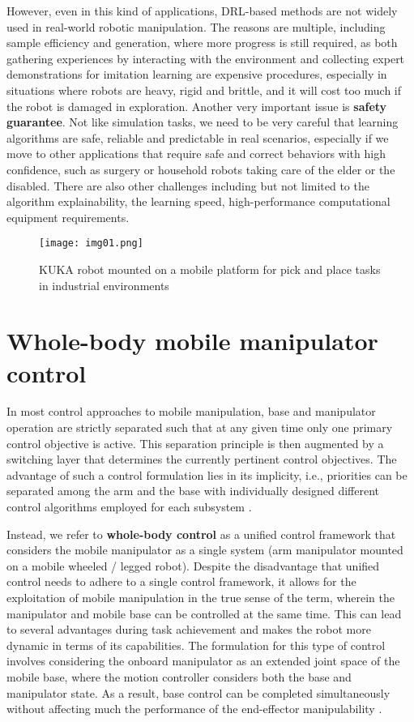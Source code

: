 However, even in this kind of applications, DRL-based methods are not widely
used in real-world robotic manipulation. The reasons are multiple, including sample efficiency and generation,
where more progress is still required, as both gathering experiences by interacting with
the environment and collecting expert demonstrations for imitation learning are expensive
procedures, especially in situations where robots are heavy, rigid and brittle, and it will
cost too much if the robot is damaged in exploration. Another very important issue is
\textbf{safety guarantee}. Not like simulation tasks, we need to be very careful that learning
algorithms are safe, reliable and predictable in real scenarios, especially if we move to
other applications that require safe and correct behaviors with high confidence, such as
surgery or household robots taking care of the elder or the disabled. There are also other
challenges including but not limited to the algorithm explainability, the learning speed,
high-performance computational equipment requirements. \cite{liu2021deep}


\begin{figure}[H]
	\centering
	\texttt{[image: img01.png]}
	\captionsetup{width=0.6\linewidth}
	\caption{KUKA robot mounted on a mobile platform for pick and place tasks
		in industrial environments \cite{liu2021deep}}
	\label{fig:img01}
\end{figure}

\section{Whole-body mobile manipulator control}

In most control approaches to mobile manipulation, base and manipulator operation are strictly
separated such that at any given time only one primary control objective is
active. This separation principle is then augmented by a switching layer that determines the
currently pertinent control objectives. The advantage of such a control formulation lies in its
implicity, i.e., priorities can be separated among the arm and the base with individually
designed different control algorithms employed for each subsystem \cite{thakar2023survey}.

Instead, we refer to \textbf{whole-body control} as a unified control framework that considers
the mobile manipulator as a single system (arm manipulator mounted on a mobile wheeled / legged robot).
Despite the disadvantage that unified control needs to adhere to a single control framework,
it allows for the exploitation of mobile manipulation in the true sense of the term,
wherein the manipulator and mobile base can be controlled at the same time. This can lead
to several advantages during task achievement and makes the robot more dynamic in terms
of its capabilities. The formulation for this type of control involves considering
the onboard manipulator as an extended joint space of the mobile base, where the motion controller
considers both the base and manipulator state. As a result, base control can be completed
simultaneously without affecting much the performance of the end-effector manipulability
\cite{thakar2023survey}.


